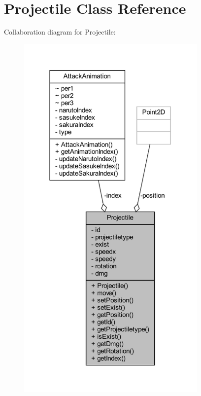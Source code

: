 \hypertarget{classobjects_1_1_projectile}{}\section{Projectile Class Reference}
\label{classobjects_1_1_projectile}


Collaboration diagram for Projectile\+:\nopagebreak
\begin{figure}[H]
\begin{center}
\leavevmode
\includegraphics[width=264pt]{classobjects_1_1_projectile__coll__graph}
\end{center}
\end{figure}
